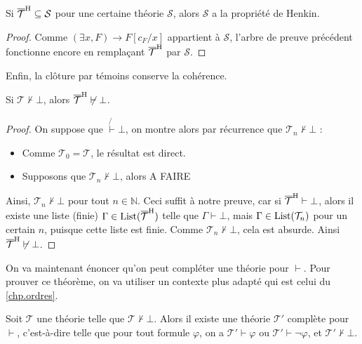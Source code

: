 \begin{property}\label{prop.henkin.ext}
  Si $\overline{\mathcal T}^{\mathrm H}\subseteq \mathcal S$ pour une certaine théorie
  $\mathcal S$, alors $\mathcal S$ a la propriété de Henkin.
\end{property}

\begin{proof}
  Comme $(\exists x,F)\to F[c_F/x]$ appartient à $\mathcal S$, l'arbre de preuve
  précédent fonctionne encore en remplaçant $\overline{\mathcal T}^{\mathrm H}$ par
  $\mathcal S$.
\end{proof}

Enfin, la clôture par témoins conserve la cohérence.

\begin{property}
  Si $\mathcal T\not\vdash \bot$, alors $\overline{\mathcal T}^{\mathrm H}\not\vdash\bot$.
\end{property}

\begin{proof}
  On suppose que $\mathcal \not\vdash\bot$, on montre alors par récurrence que
  $\mathcal T_n\not\vdash\bot$ :
  \begin{itemize}
  \item Comme $\mathcal T_0 =\mathcal T$, le résultat est direct.
  \item Supposons que $\mathcal T_n\not\vdash\bot$, alors A FAIRE
  \end{itemize}

  Ainsi, $\mathcal T_n\not\vdash\bot$ pour tout $n\in \mathbb N$. Ceci suffit à
  notre preuve, car si $\overline{\mathcal T}^{\mathrm H}\vdash \bot$, alors il existe une
  liste (finie) $\Gamma\in\operatorname{List}(\overline{\mathcal T}^{\mathrm H})$ telle que
  $\Gamma\vdash\bot$, mais $\Gamma\in\operatorname{List}(\mathcal T_n)$ pour un certain $n$,
  puisque cette liste est finie. Comme $\mathcal T_n\not\vdash\bot$, cela est
  absurde. Ainsi $\overline{\mathcal T}^{\mathrm H}\not\vdash\bot$.
\end{proof}

On va maintenant énoncer qu'on peut compléter une théorie pour $\vdash$. Pour
prouver ce théorème, on va utiliser un contexte plus adapté qui est celui du
\cref{chp.ordres}.

\begin{theorem}\label{thm.completion}
  Soit $\mathcal T$ une théorie telle que $\mathcal T \nvdash \bot$. Alors il
  existe une théorie $\mathcal T'$ complète pour $\vdash$, c'est-à-dire telle
  que pour tout formule $\varphi$, on a $\mathcal T'\vdash \varphi$ ou
  $\mathcal T'\vdash \lnot \varphi$, et $\mathcal T'\nvdash\bot$.
\end{theorem}


